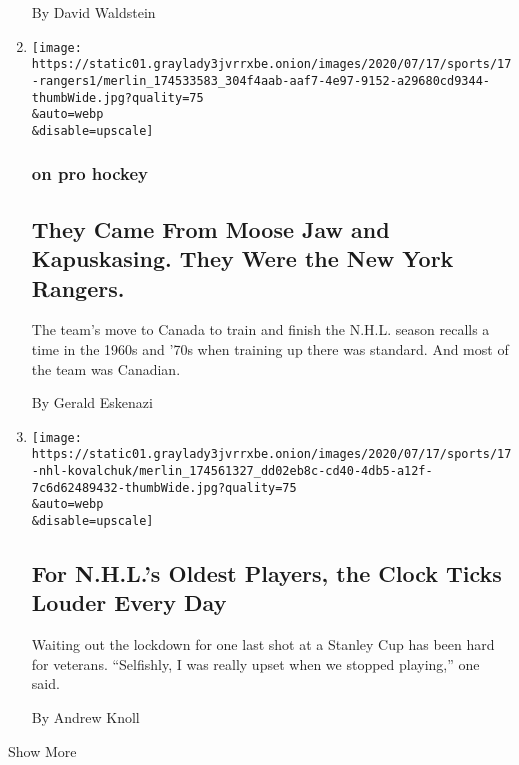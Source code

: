 \begin{enumerate}
  By David Waldstein
\item
  \href{/2020/07/19/sports/hockey/coronavirus-nhl-canada-season.html}{}

  \texttt{[image: https://static01.graylady3jvrrxbe.onion/images/2020/07/17/sports/17-rangers1/merlin\_174533583\_304f4aab-aaf7-4e97-9152-a29680cd9344-thumbWide.jpg?quality=75\\\&auto=webp\\\&disable=upscale]}

  \hypertarget{on-pro-hockey}{%
  \subsubsection{on pro hockey}\label{on-pro-hockey}}

  \hypertarget{they-came-from-moose-jaw-and-kapuskasing-they-were-the-new-york-rangers}{%
  \subsection{They Came From Moose Jaw and Kapuskasing. They Were the
  New York
  Rangers.}\label{they-came-from-moose-jaw-and-kapuskasing-they-were-the-new-york-rangers}}

  The team's move to Canada to train and finish the N.H.L. season
  recalls a time in the 1960s and '70s when training up there was
  standard. And most of the team was Canadian.

  By Gerald Eskenazi
\item
  \href{/2020/07/17/sports/hockey/nhl-training-camp-veterans.html}{}

  \texttt{[image: https://static01.graylady3jvrrxbe.onion/images/2020/07/17/sports/17-nhl-kovalchuk/merlin\_174561327\_dd02eb8c-cd40-4db5-a12f-7c6d62489432-thumbWide.jpg?quality=75\\\&auto=webp\\\&disable=upscale]}

  \hypertarget{for-nhls-oldest-players-the-clock-ticks-louder-every-day}{%
  \subsection{For N.H.L.'s Oldest Players, the Clock Ticks Louder Every
  Day}\label{for-nhls-oldest-players-the-clock-ticks-louder-every-day}}

  Waiting out the lockdown for one last shot at a Stanley Cup has been
  hard for veterans. ``Selfishly, I was really upset when we stopped
  playing,'' one said.

  By Andrew Knoll
\end{enumerate}

Show More

